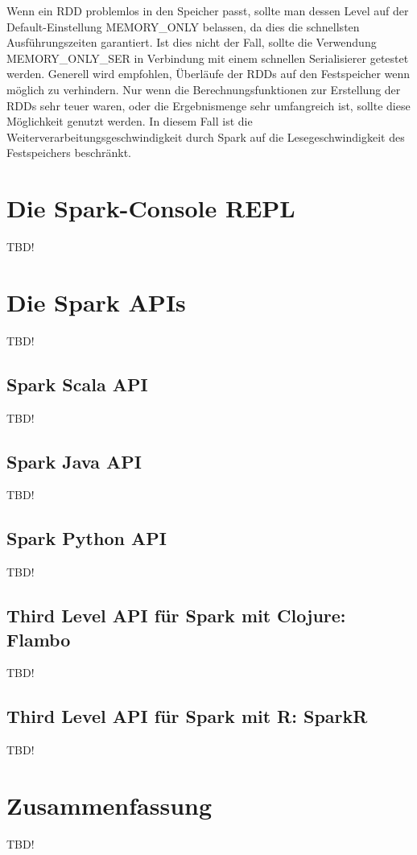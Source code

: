 Wenn ein RDD problemlos in den Speicher passt, sollte man dessen Level auf der Default-Einstellung MEMORY\_ONLY belassen, da dies die schnellsten Ausführungszeiten garantiert. Ist dies nicht der Fall, sollte die Verwendung MEMORY\_ONLY\_SER in Verbindung mit einem schnellen Serialisierer getestet werden. Generell wird empfohlen, Überläufe der RDDs auf den Festspeicher wenn möglich zu verhindern. Nur wenn die Berechnungsfunktionen zur Erstellung der RDDs sehr teuer waren, oder die Ergebnismenge sehr umfangreich ist, sollte diese Möglichkeit genutzt werden. In diesem Fall ist die Weiterverarbeitungsgeschwindigkeit durch Spark auf die Lesegeschwindigkeit des Festspeichers beschränkt.    


\section{Die Spark-Console REPL}
\label{section:repl}

TBD!



\section{Die Spark APIs}
\label{section:APIs}
TBD!

\subsection{Spark Scala API}
\label{section:scala}

TBD!

\subsection{Spark Java API}
\label{section:java}

TBD!

\subsection{Spark Python API}
\label{section:python}

TBD!

\subsection{Third Level API für Spark mit Clojure: Flambo}
\label{section:flambo}

TBD!

\subsection{Third Level API für Spark mit R: SparkR}
\label{section:sparkr}

TBD!



\section{Zusammenfassung}
\label{section:zusammen}



TBD!






















